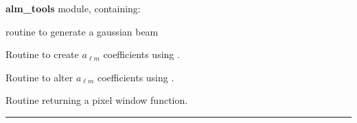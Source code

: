 \begin{modules}
  \begin{sulist}{} %
  \item[\textbf{alm\_tools}] module, containing:
	\item[\htmlref{gaussbeam}{sub:gaussbeam}] routine to generate a gaussian beam
  \end{sulist}
\end{modules}

\begin{related}
  \begin{sulist}{} %
  \item[\htmlref{create\_alm}{sub:create_alm}] Routine to create $a_{\ell m}$
  coefficients using \thedocid.
  \item[\htmlref{alter\_alm}{sub:alter_alm}] Routine to alter $a_{\ell m}$
  coefficients  using \thedocid.
  \item[\htmlref{pixel\_window}{sub:pixel_window}] Routine returning a pixel
  window function.
  \end{sulist}
\end{related}

\rule{\hsize}{2mm}

\newpage
